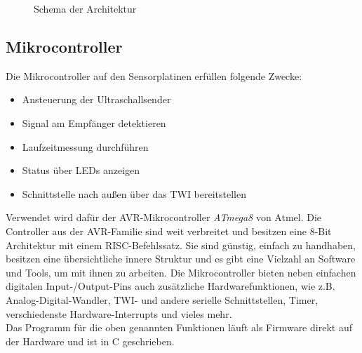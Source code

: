 \begin{figure}[H]
\caption{Schema der Architektur} \label{fig:ARCH}
\end{figure}


\subsection{Mikrocontroller}
Die Mikrocontroller auf den Sensorplatinen erfüllen folgende Zwecke:
\begin{itemize}
	\item Ansteuerung der Ultraschallsender
	\item Signal am Empfänger detektieren
	\item Laufzeitmessung durchführen
	\item Status über LEDs anzeigen
	\item Schnittstelle nach außen über das \ac{TWI} bereitstellen
\end{itemize}
Verwendet wird dafür der AVR-Mikrocontroller \textit{ATmega8} von Atmel. Die Controller aus der AVR-Familie sind weit verbreitet und besitzen eine 8-Bit Architektur mit einem \ac{RISC}-Befehlssatz. Sie sind günstig, einfach zu handhaben, besitzen eine übersichtliche innere Struktur und es gibt eine Vielzahl an Software und Tools, um mit ihnen zu arbeiten. Die Mikrocontroller bieten neben einfachen digitalen Input-/Output-Pins auch zusätzliche Hardwarefunktionen, wie z.B. Analog-Digital-Wandler, \ac{TWI}- und andere serielle Schnittstellen, Timer, verschiedenste Hardware-Interrupts und vieles mehr. \cite{datasheet:atmega}\\
Das Programm für die oben genannten Funktionen läuft als Firmware direkt auf der Hardware und ist in C geschrieben.


